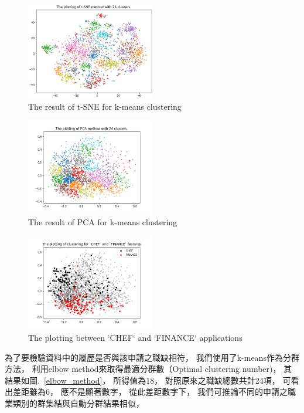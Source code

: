\documentclass[sigconf]{acmart}
\begin{document}
\begin{figure}
    \centerline{\includegraphics[width=0.5\textwidth]{t_sne.png}}
    \caption{The result of t-SNE for k-means clustering}
    \label{t_sne}
\end{figure}

\begin{figure}
    \centerline{\includegraphics[width=0.5\textwidth]{pca.png}}
    \caption{The result of PCA for k-means clustering}
    \label{pca}
\end{figure}

\begin{figure}
    \centerline{\includegraphics[width=0.5\textwidth]{chef_finance_plotting.png}}
    \caption{The plotting between `CHEF` and `FINANCE` applications}
    \label{chef_finance_plotting}
\end{figure}


為了要檢驗資料中的履歷是否與該申請之職缺相符，
我們使用了k-means\cite{macqueen1967some}作為分群方法，
利用elbow method來取得最適分群數（Optimal clustering number)，
其結果如圖.~\ref{elbow_method}，
所得值為18，
對照原來之職缺總數共計24項，
可看出差距雖為6，
應不是顯著數字，
從此差距數字下，
我們可推論不同的申請之職業類別的群集結與自動分群結果相似，
\end{document}
